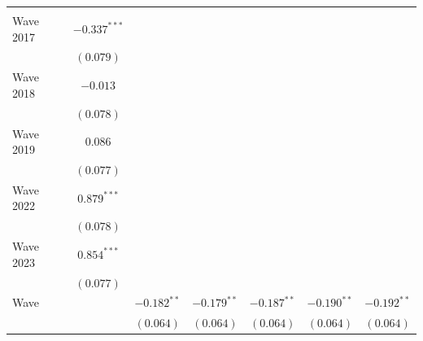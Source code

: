 \documentclass[
  12pt,
]{article}
\begin{document}
\begin{table}
\begin{center}
{\begin{tabular}{l c c c c c c c}
                                                      &                &                &                &                &                &               &                \\
\quad Wave 2017                                       &                & $-0.337^{***}$ &                &                &                &               &                \\
                                                      &                & $(0.079)$      &                &                &                &               &                \\
\quad Wave 2018                                       &                & $-0.013$       &                &                &                &               &                \\
                                                      &                & $(0.078)$      &                &                &                &               &                \\
\quad Wave 2019                                       &                & $0.086$        &                &                &                &               &                \\
                                                      &                & $(0.077)$      &                &                &                &               &                \\
\quad Wave 2022                                       &                & $0.879^{***}$  &                &                &                &               &                \\
                                                      &                & $(0.078)$      &                &                &                &               &                \\
\quad Wave 2023                                       &                & $0.854^{***}$  &                &                &                &               &                \\
                                                      &                & $(0.077)$      &                &                &                &               &                \\
Wave                                                  &                &                & $-0.182^{**}$  & $-0.179^{**}$  & $-0.187^{**}$  & $-0.190^{**}$ & $-0.192^{**}$  \\
                                                      &                &                & $(0.064)$      & $(0.064)$      & $(0.064)$      & $(0.064)$     & $(0.064)$      \\

\end{tabular}}
\end{center}
\end{table}
\end{document}
